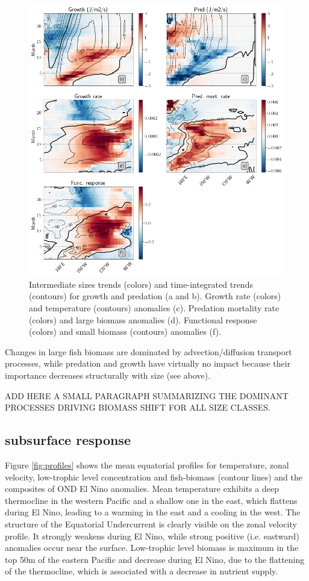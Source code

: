 \begin{figure}[h!tp]
	\centering
	\includegraphics[scale=0.4]{figs/fig9.png}	
	\caption{Intermediate sizes trends (colors) and time-integrated trends (contours) for growth and predation (a and b). Growth rate (colors) and temperature (contours) anomalies (c). Predation mortality rate (colors) and large biomass anomalies (d). Functional response (colors) and small biomass (contours) anomalies (f).}	
	\label{fig:fig9}
\end{figure}

Changes in large fish biomass are dominated by advection/diffusion transport processes, while predation and growth have virtually no impact because their importance decreases structurally with size (see above). 

ADD HERE A SMALL PARAGRAPH SUMMARIZING THE DOMINANT PROCESSES DRIVING BIOMASS SHIFT FOR ALL SIZE CLASSES.

\subsection{subsurface response}

Figure \ref{fig:profiles} shows the mean equatorial profiles for temperature, zonal velocity, low-trophic level concentration and fish-biomass (contour lines) and the composites of OND El Nino anomalies. Mean temperature exhibits a deep thermocline in the western Pacific and a shallow one in the east, which flattens during El Nino, leading to a warming in the east and a cooling in the west. The structure of the Equatorial Undercurrent is clearly visible on the zonal velocity profile. It strongly weakens during El Nino, while strong positive (i.e. eastward) anomalies occur near the surface. Low-trophic level biomass is maximum in the top 50m of the eastern Pacific and decrease during El Nino, due to the flattening of the thermocline, which is associated with a decrease in nutrient supply.

